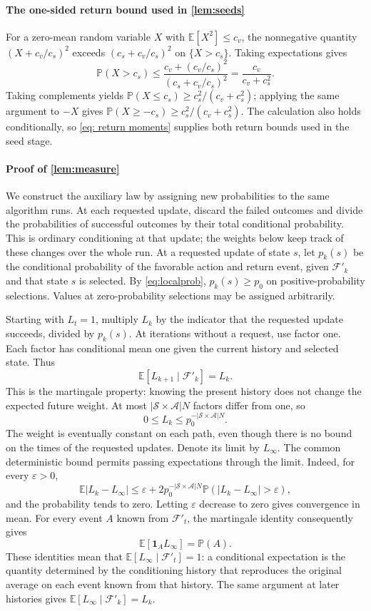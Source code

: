 \paragraph{The one-sided return bound used in \autoref{lem:seeds}}
For a zero-mean random variable $X$ with $\mathbb E[X^2]\le c_v$, the nonnegative quantity $(X+c_v/c_s)^2$ exceeds $(c_s+c_v/c_s)^2$ on $\{X>c_s\}$. Taking expectations gives
\[
\mathbb P(X>c_s)
\le\frac{c_v+(c_v/c_s)^2}{(c_s+c_v/c_s)^2}
=\frac{c_v}{c_v+c_s^2}.
\]
Taking complements yields $\mathbb P(X\le c_s)\ge c_s^2/(c_v+c_s^2)$; applying the same argument to $-X$ gives $\mathbb P(X\ge-c_s)\ge c_s^2/(c_v+c_s^2)$. The calculation also holds conditionally, so \eqref{eq: return moments} supplies both return bounds used in the seed stage.

\paragraph{Proof of \autoref{lem:measure}}
We construct the auxiliary law by assigning new probabilities to the same algorithm runs. At each requested update, discard the failed outcomes and divide the probabilities of successful outcomes by their total conditional probability. This is ordinary conditioning at that update; the weights below keep track of these changes over the whole run.
At a requested update of state $s$, let $p_k(s)$ be the conditional probability of the favorable action and return event, given $\mathcal F'_k$ and that state $s$ is selected. By \eqref{eq:localprob}, $p_k(s)\ge p_0$ on positive-probability selections. Values at zero-probability selections may be assigned arbitrarily.

Starting with $L_t=1$, multiply $L_k$ by the indicator that the requested update succeeds, divided by $p_k(s)$. At iterations without a request, use factor one. Each factor has conditional mean one given the current history and selected state. Thus
\[
\mathbb E[L_{k+1}\mid\mathcal F'_k]=L_k.
\]
This is the martingale property: knowing the present history does not change the expected future weight. At most $|\mathcal S\times\mathcal A|N$ factors differ from one, so
\[
0\le L_k\le p_0^{-|\mathcal S\times\mathcal A|N}.
\]
The weight is eventually constant on each path, even though there is no bound on the times of the requested updates. Denote its limit by $L_\infty$. The common deterministic bound permits passing expectations through the limit. Indeed, for every $\varepsilon>0$,
\[
\mathbb E|L_k-L_\infty|
\le\varepsilon+2p_0^{-|\mathcal S\times\mathcal A|N}
\mathbb P(|L_k-L_\infty|>\varepsilon),
\]
and the probability tends to zero. Letting $\varepsilon$ decrease to zero gives convergence in mean.
For every event $A$ known from $\mathcal F'_t$, the martingale identity consequently gives
\[
\mathbb E[\mathbf1_A L_\infty]=\mathbb P(A).
\]
These identities mean that $\mathbb E[L_\infty\mid\mathcal F'_t]=1$: a conditional expectation is the quantity determined by the conditioning history that reproduces the original average on each event known from that history. The same argument at later histories gives $\mathbb E[L_\infty\mid\mathcal F'_k]=L_k$.

